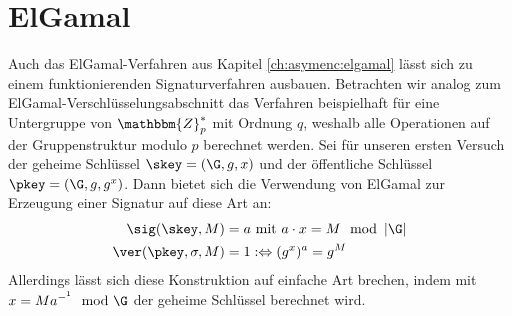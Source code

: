 \section{ElGamal}
Auch das ElGamal-Verfahren aus Kapitel \ref{ch:asymenc:elgamal} lässt sich zu einem funktionierenden Signaturverfahren ausbauen. Betrachten wir analog zum ElGamal-Verschlüsselungsabschnitt das Verfahren beispielhaft für eine Untergruppe von $\mathbbm{Z}^*_p$ mit Ordnung $q$, weshalb alle Operationen auf der Gruppenstruktur modulo $p$ berechnet werden. Sei für unseren ersten Versuch der geheime Schlüssel $\skey = (\G, g, x)$ und der öffentliche Schlüssel $\pkey = (\G, g, g^x)$. Dann bietet sich die Verwendung von ElGamal zur Erzeugung einer Signatur auf diese Art an:
\begin{align*}
\sig(\skey,M) &= a \text{ mit } a \cdot x = M \mod \left|\G\right|\\
\ver(\pkey,\sigma,M) &= 1 :\Leftrightarrow (g^x)^a = g^M
\end{align*}
Allerdings lässt sich diese Konstruktion auf einfache Art brechen, indem mit $x = M a^{-^1} \mod \G$ der geheime Schlüssel berechnet wird.

